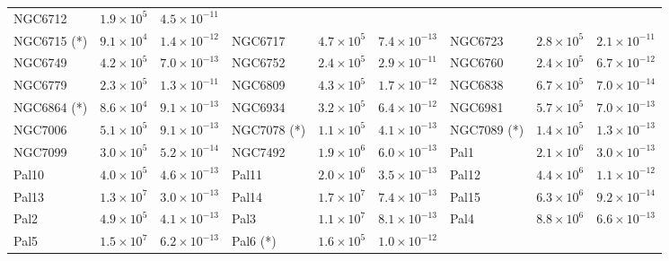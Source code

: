 \begin{table}
\begin{center}
\begin{tabular}{l | c | c | l |  c|   c | l | c | c }
            NGC6712 &  $1.9\times10^5$ &          $4.5\times10^{-11}$  \\
            NGC6715 (*) &  $9.1\times10^4$ &          $1.4\times10^{-12}$&
            NGC6717 &  $4.7\times10^5$ &          $7.4\times10^{-13}$  &
            NGC6723 &  $2.8\times10^5$ &          $2.1\times10^{-11}$  \\
            NGC6749 &  $4.2\times10^5$ &         $7.0\times10^{-13}$  &
            NGC6752 &  $2.4\times10^5$ &          $2.9\times10^{-11}$ &
            NGC6760 &  $2.4\times10^5$ &          $6.7\times10^{-12}$ \\ 
            NGC6779 &  $2.3\times10^5$ &          $1.3\times10^{-11}$  &
            NGC6809 &  $4.3\times10^5$ &          $1.7\times10^{-12}$  &
            NGC6838 &  $6.7\times10^5$ &          $7.0\times10^{-14}$  \\
            NGC6864 (*) &  $8.6\times10^4$ &          $9.1\times10^{-13}$  &
            NGC6934 &  $3.2\times10^5$ &          $6.4\times10^{-12}$  &
            NGC6981 &  $5.7\times10^5$ &          $7.0\times10^{-13}$ \\
            NGC7006 &  $5.1\times10^5$ &          $9.1\times10^{-13}$ &
            NGC7078 (*) &  $1.1\times10^5$ &          $4.1\times10^{-13}$  &
            NGC7089 (*) &  $1.4\times10^5$ &          $1.3\times10^{-13}$ \\
            NGC7099 & $ 3.0\times10^5$ &          $5.2\times10^{-14}$  &
            NGC7492 &  $1.9\times10^6$ &          $6.0\times10^{-13}$ &
                Pal1 &  $2.1\times10^6$ &          $3.0\times10^{-13}$ \\
                Pal10 &  $4.0\times10^5 $&          $4.6\times10^{-13}$  &
                Pal11 &  $2.0\times10^6$ &          $3.5\times10^{-13}$  &
                Pal12 &  $4.4\times10^6$ &          $1.1\times10^{-12}$  \\
                Pal13 &  $1.3\times10^7$ &          $3.0\times10^{-13}$  &
                Pal14 &  $1.7\times10^7$ &          $7.4\times10^{-13}$  &
                Pal15 &  $6.3\times10^6$ &          $9.2\times10^{-14}$  \\
                Pal2 &  $4.9\times10^5$ &          $4.1\times10^{-13}$  &
                Pal3 &  $1.1\times10^7$ &          $8.1\times10^{-13}$  &
                Pal4 &  $8.8\times10^6$ &          $6.6\times10^{-13}$  \\
                Pal5 &  $1.5\times10^7$ &          $6.2\times10^{-13}$  &
                Pal6 (*) &  $1.6\times10^5$ &          $1.0\times10^{-12}$ &

\end{tabular}
\end{center}
\end{table}
